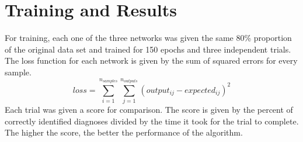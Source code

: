 \documentclass[12pt]{article}
\begin{document}
\section{Training and Results}
    For training, each one of the three networks was given the same 80\% proportion of the original data set and trained for
    150 epochs and three independent trials.
    The loss function for each network is given by the sum of squared errors for every sample.
    \begin{equation}\label{sumSquaredErrs}
        loss = \sum_{i=1}^{n_{samples}} \sum_{j=1}^{n_{outputs}} (output_{ij} - expected_{ij})^2
    \end{equation}
    Each trial was given a score for comparison.  The score is given by the percent of correctly identified diagnoses divided by the time it took for the
    trial to complete.  The higher the score, the better the performance of the algorithm.
    \pagebreak
\end{document}
